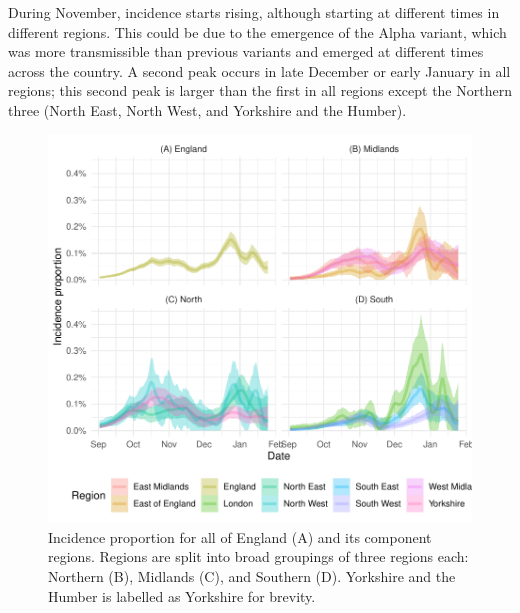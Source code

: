 \documentclass[thesis.tex]{subfiles}
\begin{document}
During November, incidence starts rising, although starting at different times in different regions.
This could be due to the emergence of the Alpha variant, which was more transmissible than previous variants and emerged at different times across the country.
A second peak occurs in late December or early January in all regions; this second peak is larger than the first in all regions except the Northern three (North East, North West, and Yorkshire and the Humber).
\begin{figure}
    \includegraphics{transmission/backcalc-regions}
    \caption[Incidence estimated using backcalculation by region]{%
        Incidence proportion for all of England (A) and its component regions.
        Regions are split into broad groupings of three regions each: Northern (B), Midlands (C), and Southern (D).
        Yorkshire and the Humber is labelled as Yorkshire for brevity.
    }
    \label{transmission:fig:backcalc-regions}
\end{figure}
\end{document}
